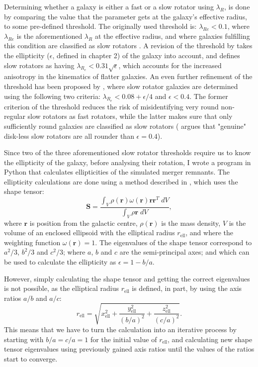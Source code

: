 \documentclass[english, oneside]{HYgradu}
\begin{document}
Determining whether a galaxy is either a fast or a slow rotator using $\lambda_R$, is done by comparing the value that the parameter gets at the galaxy's effective radius, to some pre-defined threshold. The originally used threshold is: $\lambda_{Re} < 0.1$, where $\lambda_{Re}$ is the aforementioned $\lambda_R$ at the effective radius, and where galaxies fulfilling this condition are classified as slow rotators \citep{Emsellem2007}. A revision of the threshold by \cite{Emsellem2011} takes the ellipticity ($\epsilon$, defined in chapter 2) of the galaxy into account, and defines slow rotators as having $\lambda_{R_e} < 0.31 \sqrt{\epsilon}$, which accounts for the increased anisotropy in the kinematics of flatter galaxies. An even further refinement of the threshold has been proposed by \cite{Cappellari2016}, where slow rotator galaxies are determined using the following two criteria: $\lambda_{R_e} < 0.08 + \epsilon/4$ and $\epsilon < 0.4$. The former criterion of the threshold reduces the risk of misidentifying very round non-regular slow rotators as fast rotators, while the latter makes sure that only sufficiently round galaxies are classified as slow rotators (\cite{Cappellari2016} argues that "genuine" disk-less slow rotators are all rounder than $\epsilon = 0.4$).

Since two of the three aforementioned slow rotator thresholds require us to know the ellipticity of the galaxy, before analysing their rotation, I wrote a program in Python that calculates ellipticities of the simulated merger remnants. The ellipticity calculations are done using a method described in \cite{Zemp2011}, which uses the shape tensor:
\begin{equation}
\mathbf{S} = \frac{\int_V \rho(\mathbf{r}) \omega(\mathbf{r}) \mathbf{r} \mathbf{r}^T \; dV }{\int_V \rho{\mathbf{r}} \; dV},
\end{equation}
where $\mathbf{r}$ is position from the galactic centre, $\rho(\mathbf{r})$ is the mass density, $V$ is the volume of an enclosed ellipsoid with the elliptical radius $r_\mathrm{ell}$, and where the weighting function $\omega(\mathbf{r}) = 1$. The eigenvalues of the shape tensor correspond to $a^2/3$, $b^2/3$ and $c^2/3$; where $a$, $b$ and $c$ are the semi-principal axes; and which can be used to calculate the ellipticity as $\epsilon = 1 - b/a$. 

However, simply calculating the shape tensor and getting the correct eigenvalues is not possible, as the elliptical radius $r_\mathrm{ell}$ is defined, in part, by using the axis ratios $a/b$ and $a/c$:
\begin{equation}
r_\mathrm{ell} = \sqrt{x_\mathrm{ell}^2 + \frac{y_\mathrm{ell}^2}{(b/a)^2} + \frac{z_\mathrm{ell}^2}{(c/a)^2}}.
\end{equation}
This means that we have to turn the calculation into an iterative process by starting with $b/a = c/a = 1$ for the initial value of $r_\mathrm{ell}$, and calculating new shape tensor eigenvalues using previously gained axis ratios until the values of the ratios start to converge. 
\end{document}
